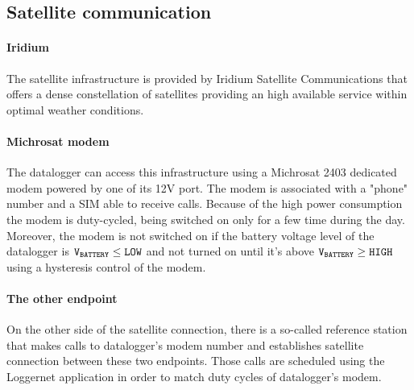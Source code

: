 \subsection{Satellite communication}
\paragraph{Iridium}
The satellite infrastructure is provided by Iridium Satellite Communications that offers a dense constellation of satellites providing an high available service within optimal weather conditions.
\paragraph{Michrosat modem}
The datalogger can access this infrastructure using a Michrosat 2403 dedicated modem powered  by one of its 12V port. The modem is associated with a "phone" number and a SIM able to receive calls. Because of the high power consumption the modem is duty-cycled, being switched on only for a few time during the day. Moreover, the modem is not switched on if the battery voltage level of the datalogger is ${\tt V_{BATTERY} \leq LOW}$ and not turned on until it's above ${\tt V_{BATTERY} \geq HIGH}$ using a hysteresis control of the modem. \cite{avv1}
\paragraph{The other endpoint}
On the other side of the satellite connection, there is a so-called reference station that makes calls to datalogger's modem number and establishes satellite connection between these two endpoints. Those calls are scheduled using the Loggernet application in order to match duty cycles of datalogger's modem.
